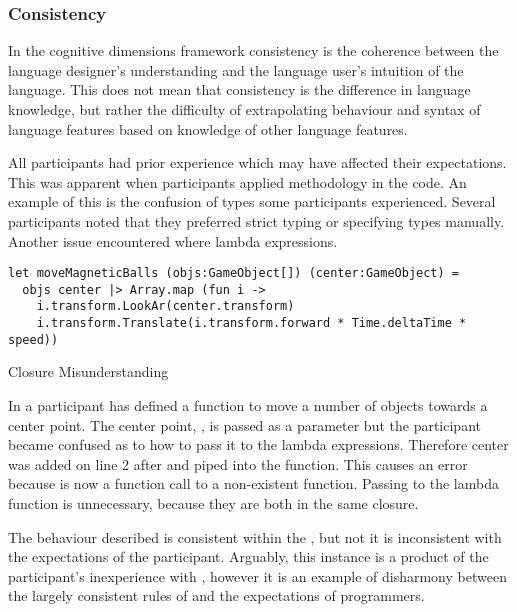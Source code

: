 \subsubsection{Consistency} %
In the cognitive dimensions framework consistency is the coherence between the language designer's understanding and the language user's intuition of the language\cite{green1996usability}. This does not mean that consistency is the difference in language knowledge, but rather the difficulty of extrapolating behaviour and syntax of language features based on knowledge of other language features.

All participants had prior \cs experience which may have affected their expectations. This was apparent when participants applied \cs methodology in the \fs code. An example of this is the confusion of types some participants experienced. Several participants noted that they preferred strict typing or specifying types manually. Another issue encountered where lambda expressions.

\begin{listing}
\begin{verbatim}
let moveMagneticBalls (objs:GameObject[]) (center:GameObject) =
  objs center |> Array.map (fun i ->
    i.transform.LookAr(center.transform)
    i.transform.Translate(i.transform.forward * Time.deltaTime * speed))
\end{verbatim}
\caption{Closure Misunderstanding}
\label{lst:clos-mis}
\end{listing}

In  a participant has defined a function to move a number of objects towards a center point. The center point, , is passed as a parameter but the participant became confused as to how to pass it to the lambda expressions. Therefore center was added on line 2 after  and piped into the  function. This causes an error because  is now a function call to a non-existent function. Passing  to the lambda function is unnecessary, because they are both in the same closure.

The behaviour described is consistent within the \fs, but not it is inconsistent with the expectations of the participant. Arguably, this instance is a product of the participant's inexperience with \fs, however it is an example of disharmony between the largely consistent rules of \fs and the expectations of programmers.
